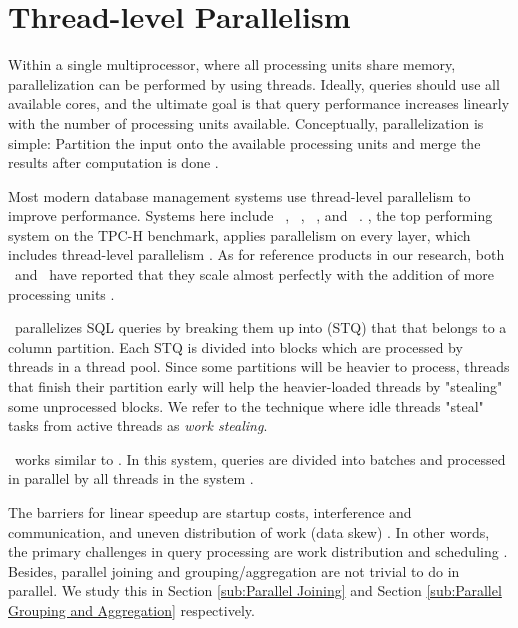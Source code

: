 \section{Thread-level Parallelism}
\label{sec:Thread-lever Parallelism}
Within a single multiprocessor, where all processing units share memory, parallelization can be performed by using threads. Ideally, queries should use all available cores, and the ultimate goal is that query performance increases linearly with the number of processing units available. Conceptually, parallelization is simple: Partition the input onto the available processing units and merge the results after computation is done \cite{Neumann2011-uq}.

Most modern database management systems use thread-level parallelism to improve performance. Systems here include \vertica~\cite{Lamb2012-kg}, \mssql~\cite{Larson2013-mc}, \blink~\cite{Barber2012-xt, Johnson2008-cp}, and \saph~\cite{Farber2012-vh}. \exasol, the top performing system on the TPC-H benchmark, applies parallelism on every layer, which includes thread-level parallelism \cite{Exasol2014-xh}. As for reference products in our research, both \qlikview~and \tableau~have reported that they scale almost perfectly with the addition of more processing units \cite{Kamkolkar2015-iq, Qlik2011-ef}. 

\blink~parallelizes SQL queries by breaking them up into  (STQ) that that belongs to a column partition. Each STQ is divided into blocks which are processed by threads in a thread pool. Since some partitions will be heavier to process, threads that finish their partition early will help the heavier-loaded threads by "stealing" some unprocessed blocks. We refer to the technique where idle threads "steal" tasks from active threads as \textit{work stealing}. 

\mssql~works similar to \blink. In this system, queries are divided into batches and processed in parallel by all threads in the system \cite{Larson2013-mc}.

The barriers for linear speedup are startup costs, interference and communication, and uneven distribution of work (data skew) \cite{DeWitt1992-ki}. In other words, the primary challenges in query processing are work distribution and scheduling \cite{Neumann2011-uq}. Besides, parallel joining and grouping/aggregation are not trivial to do in parallel. We study this in Section \ref{sub:Parallel Joining} and Section \ref{sub:Parallel Grouping and Aggregation} respectively.

